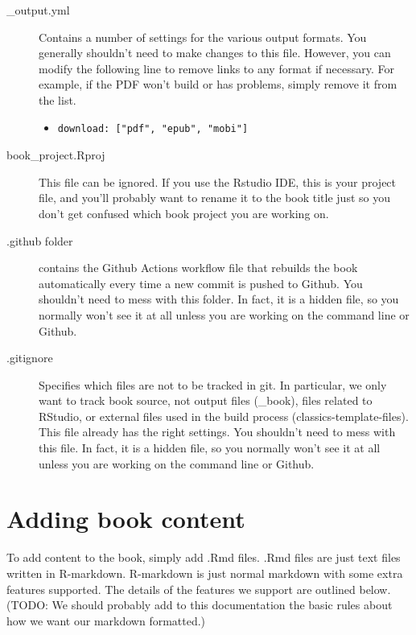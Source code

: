 \documentclass[
  english,
]{book}
\begin{document}
\begin{description}
\item[\_output.yml]
Contains a number of settings for the various output formats. You generally shouldn't need to make changes to this file. However, you can modify the following line to remove links to any format if necessary. For example, if the PDF won't build or has problems, simply remove it from the list.

\begin{itemize}
\item
\begin{verbatim}
download: ["pdf", "epub", "mobi"]
\end{verbatim}
\end{itemize}
\item[book\_project.Rproj]
This file can be ignored. If you use the Rstudio IDE, this is your project file, and you'll probably want to rename it to the book title just so you don't get confused which book project you are working on.
\item[.github folder]
contains the Github Actions workflow file that rebuilds the book automatically every time a new commit is pushed to Github. You shouldn't need to mess with this folder. In fact, it is a hidden file, so you normally won't see it at all unless you are working on the command line or Github.
\item[.gitignore]
Specifies which files are not to be tracked in git. In particular, we only want to track book source, not output files (\_book), files related to RStudio, or external files used in the build process (classics-template-files). This file already has the right settings. You shouldn't need to mess with this file. In fact, it is a hidden file, so you normally won't see it at all unless you are working on the command line or Github.
\end{description}

\hypertarget{adding-book-content}{%
\section{Adding book content}\label{adding-book-content}}

To add content to the book, simply add .Rmd files. .Rmd files are just text files written in R-markdown. R-markdown is just normal markdown with some extra features supported. The details of the features we support are outlined below. (TODO: We should probably add to this documentation the basic rules about how we want our markdown formatted.)
\end{document}
